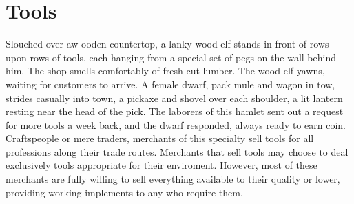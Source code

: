 \documentclass[10pt,a4paper,twoside,twocolumn,openany,nodeprecatedcode,bg=print]{dndbook}
\begin{document}
\section{Tools}
Slouched over aw ooden countertop, a lanky wood elf stands in front of rows upon rows of tools, each hanging from a special set of pegs on the wall behind him. The shop smells comfortably of fresh cut lumber. The wood elf yawns, waiting for customers to arrive.
A female dwarf, pack mule and wagon in tow, strides casually into town, a pickaxe and shovel over each shoulder, a lit lantern resting near the head of the pick. The laborers of this hamlet sent out a request for more tools a week back, and the dwarf responded, always ready to earn coin.
Craftspeople or mere traders, merchants of this specialty sell tools for all professions along their trade routes. Merchants that sell tools may choose to deal exclusively tools appropriate for their enviroment. However, most of these merchants are fully willing to sell everything available to their quality or lower, providing working implements to any who require them.
\end{document}
